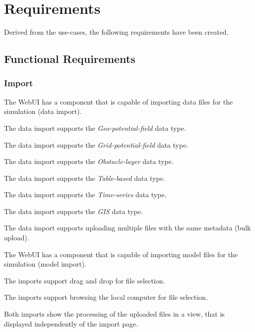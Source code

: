 \begin{usecase}
\end{usecase}



\section{Requirements}
Derived from the use-cases, the following requirements have been created.


\subsection{Functional Requirements}

\subsubsection{Import}
\reqstartF
\item The WebUI has a component that is capable of importing data files for the simulation (data import).
\item The data import supports the \textit{Geo-potential-field} data type.
\item The data import supports the \textit{Grid-potential-field} data type.
\item The data import supports the \textit{Obstacle-layer} data type.
\item The data import supports the \textit{Table-based} data type.
\item The data import supports the \textit{Time-series} data type.
\item The data import supports the \textit{GIS} data type.
\item The data import supports uploading multiple files with the same metadata (bulk upload).
\item The WebUI has a component that is capable of importing model files for the simulation (model import).
\item The imports support drag and drop for file selection.
\item The imports support browsing the local computer for file selection.
\item Both imports show the processing of the uploaded files in a view, that is displayed independently of the import page.
\reqendF

